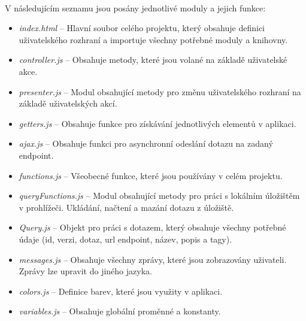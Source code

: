 \documentclass[
12pt,
a4paper,
pdftex,
czech,
titlepage
]{report}
\begin{document}
\\
V následujícím seznamu jsou posány jednotlivé moduly a jejich funkce:
\begin{itemize}
	\item \textit{index.html} -- Hlavní soubor celého projektu, který obsahuje definici uživatelského rozhraní a importuje všechny potřebné moduly a knihovny.
	\item \textit{controller.js} -- Obsahuje metody, které jsou volané na základě uživatelské akce.
	\item \textit{presenter.js} -- Modul obsahující metody pro změnu uživatelského rozhraní na základě uživatelských akcí.
	\item \textit{getters.js} -- Obsahuje funkce pro získávání jednotlivých elementů v aplikaci.
	\item \textit{ajax.js} -- Obsahuje funkci pro asynchronní odeslání dotazu na zadaný endpoint.
	\item \textit{functions.js} -- Všeobecné funkce, které jsou používány v celém projektu.
	\item \textit{queryFunctions.js} -- Modul obsahující metody pro práci s lokálním úložištěm v prohlížeči. Ukládání, načtení a mazání dotazu z úložiště.
	\item \textit{Query.js} -- Objekt pro práci s dotazem, který obsahuje všechny potřebné údaje (id, verzi, dotaz, url endpoint, název, popis a tagy).
	\item \textit{messages.js} -- Obsahuje všechny zprávy, které jsou zobrazovány uživateli. Zprávy lze upravit do jiného jazyka.
	\item \textit{colors.js} -- Definice barev, které jsou využity v aplikaci.
	\item \textit{variables.js} -- Obsahuje globální proměnné a konstanty.
\end{itemize}
\end{document}
